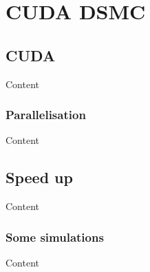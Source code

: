 
\chapter{CUDA DSMC} %

\label{ch:cudadsmc} %


\section{CUDA}

Content


\subsection{Parallelisation}

Content


\section{Speed up}

Content


\subsection{Some simulations}

Content